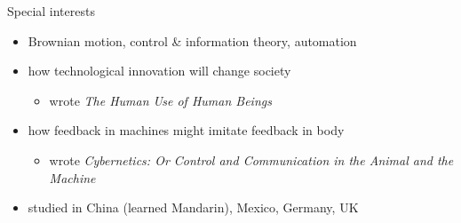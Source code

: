 \documentclass{beamer}
\begin{document}
\begin{frame}{Special interests}
\begin{itemize}
  \item Brownian motion, control \& information theory,
    automation
  \item how technological innovation will
    change society 
  \begin{itemize}
    \item wrote \emph{The Human Use of Human Beings}
    \end{itemize}
  \item how feedback in machines might imitate feedback in body
  \begin{itemize}
    \item wrote \emph{Cybernetics: Or Control
      and Communication in the Animal and the Machine}
    \end{itemize}
  \item studied in China (learned Mandarin), Mexico, Germany, UK
  \end{itemize}
\end{frame}
\end{document}
